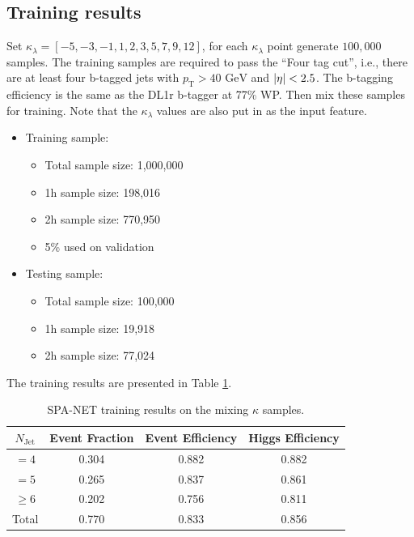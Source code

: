 \documentclass[12pt]{article}
\begin{document}
	\subsection{Training results}%
	\label{sub:training_results_mix}
		Set $\kappa_\lambda = [-5, -3, -1, 1, 2, 3, 5, 7, 9, 12]$, for each $\kappa_\lambda$ point generate $100,000$ samples. The training samples are required to pass the ``Four tag cut'', i.e., there are at least four b-tagged jets with $p_{\text{T}} > \text{40 GeV}$ and $\abs{\eta} < 2.5$. The b-tagging efficiency is the same as the DL1r b-tagger at 77\% WP. Then mix these samples for training. Note that the $\kappa_\lambda$ values are also put in as the input feature.
		\begin{itemize}
			\item Training sample:
			\begin{itemize}
				\item Total sample size: 1,000,000
				\item 1h sample size: 198,016
				\item 2h sample size: 770,950
				\item 5\% used on validation
			\end{itemize}
			\item Testing sample: 
			\begin{itemize}
				\item Total sample size: 100,000
				\item 1h sample size: 19,918
				\item 2h sample size: 77,024
			\end{itemize}
		\end{itemize}
		The training results are presented in Table \ref{tab:SPANet_diHiggs_4btag_DL1r_pt40_mix}.
		\begin{table}[htpb]
			\centering
			\caption{SPA-NET training results on the mixing $\kappa$ samples.}
			\label{tab:SPANet_diHiggs_4btag_DL1r_pt40_mix}
			\begin{tabular}{c|c|cc}
				$N_\text{Jet}$ & Event Fraction & Event Efficiency & Higgs Efficiency \\
				\hline
				$=4$	  &   0.304             &    0.882              &    0.882             \\
				$=5$	  &   0.265             &    0.837              &    0.861             \\
				$\ge 6$	  &   0.202             &    0.756              &    0.811             \\
				Total	  &   0.770             &    0.833              &    0.856             \\
			\end{tabular}
		\end{table}
	
\end{document}
